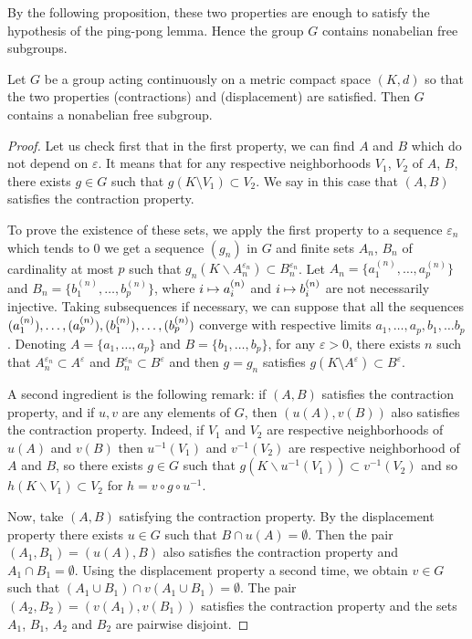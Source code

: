 \documentclass[10pt]{amsart}
\theoremstyle{definition}\newtheorem{defi}[theo]{Definition}\newtheorem{rema}[theo]{Remark}\newtheorem{exam}[theo]{Example}\newtheorem{exem}[theo]{Example}\newtheorem{nota}[theo]{Notation}
\newcommand{\ep}{\varepsilon}
\newcounter{setofcase}
\newcounter{case}[setofcase]
\let\oldmapsto\mapsto
\renewcommand*{\mapsto}{\mathchoice{\longmapsto}{\oldmapsto}{\oldmapsto}{\oldmapsto}}
\begin{document}
By the following proposition, these two properties are enough to satisfy the hypothesis of the {ping-pong lemma}. Hence the group $G$ contains nonabelian free subgroups.

\begin{prop}
Let $G$ be a group acting continuously on a metric compact space $(K,d)$ so that the two properties (contractions) and (displacement) are satisfied. Then $G$ contains a nonabelian free subgroup.
\end{prop}

\begin{proof}
Let us check first that in the first property, we can find $A$ and $B$ which do not depend on $\ep$. It means that for any respective neighborhoods $V_1$, $V_2$ of $A$, $B$, there exists $g\in G$ such that $g(K \setminus V_1)\subset V_2$. We say in this case that $(A,B)$ satisfies the contraction property.


To prove the existence of these sets, we apply the first property to a sequence $\ep_n$ which tends to $0$ we get a sequence $(g_n)$ in $G$ and finite sets $A_n$, $B_n$ of cardinality at most $p$ such that $g_n(K\backslash A_n^{\ep_n})\subset B_n^{\ep_n}$. Let $A_n=\{a_1^{(n)},\dots,a_p^{(n)}\}$ and $B_n=\{b_1^{(n)},\dots,b_p^{(n)}\}$, where $i \mapsto a_i^{(n)}$ and $i \mapsto b_i^{(n)}$ are not necessarily injective. Taking subsequences if necessary, we can suppose that all the sequences $(a_1^{(n)}),\dots,(a_p^{(n)}),\linebreak(b_1^{(n)}),\dots,(b_p^{(n)})$ converge with respective limits $a_1,\dots,a_p,b_1,\dots b_p$. Denoting $A=\{a_1,\dots,a_p\}$ and $B=\{b_1,\dots,b_p\}$, for any $\ep>0$, there exists $n$ such that $A_n^{\ep_n}\subset A^\ep$ and $B_n^{\ep_n}\subset B^\ep$ and then $g=g_n$ satisfies $g(K \setminus A^\ep)\subset B^\ep$.

A second ingredient is the following remark: if $(A,B)$ satisfies the contraction property, and if $u,v$ are any elements of $G$, then $(u(A),v(B))$ also satisfies the contraction property. Indeed, if $V_1$ and $V_2$ are respective neighborhoods of $u(A)$ and $v(B)$ then $u^{-1}(V_1)$ and $v^{-1}(V_2)$ are respective neighborhood of $A$ and $B$, so there exists $g\in G$ such that $g(K\backslash u^{-1}(V_1))\subset v^{-1}(V_2)$ and so $h(K\backslash V_1)\subset V_2$ for $h=v\circ g\circ u^{-1}$.

Now, take $(A,B)$ satisfying the contraction property. By the displacement property there exists $u\in G$ such that $B\cap u(A)=\emptyset$. Then the pair $(A_1,B_1)=(u(A),B)$ also satisfies the contraction property and $A_1\cap B_1=\emptyset$. Using the displacement property a second time, we obtain $v\in G$ such that $(A_1\cup B_1)\cap v(A_1\cup B_1)=\emptyset$. The pair $(A_2,B_2)=(v(A_1),v(B_1))$ satisfies the contraction property and the sets $A_1$, $B_1$, $A_2$ and $B_2$ are pairwise disjoint.


\end{proof}
\end{document}

